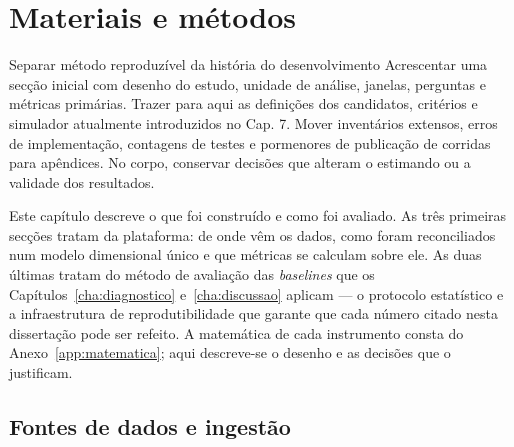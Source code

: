 
\chapter{Materiais e métodos}
\label{cha:metodos}
{Separar método reproduzível da história do desenvolvimento}
{Acrescentar uma secção inicial com desenho do estudo, unidade de análise,
janelas, perguntas e métricas primárias. Trazer para aqui as definições
dos candidatos, critérios e simulador atualmente introduzidos no Cap. 7.
Mover inventários extensos, erros de implementação, contagens de testes
e pormenores de publicação de corridas para apêndices. No corpo,
conservar decisões que alteram o estimando ou a validade dos resultados.}%

Este capítulo descreve o que foi construído e como foi avaliado. As três
primeiras secções tratam da plataforma: de onde vêm os dados, como foram
reconciliados num modelo dimensional único e que métricas se calculam sobre
ele. As duas últimas tratam do método de avaliação das \emph{baselines} que
os Capítulos~\ref{cha:diagnostico} e~\ref{cha:discussao} aplicam --- o
protocolo estatístico e a infraestrutura de reprodutibilidade que garante
que cada número citado nesta dissertação pode ser refeito. A matemática de
cada instrumento consta do Anexo~\ref{app:matematica}; aqui descreve-se o
desenho e as decisões que o justificam.

\section{Fontes de dados e ingestão}
\label{sec:fontes}

